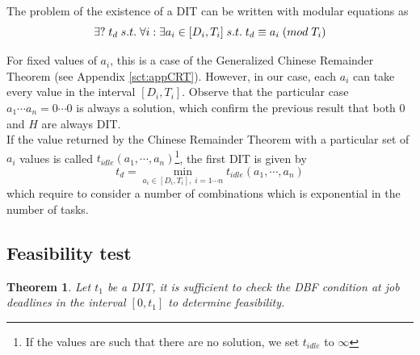 \documentclass[a4paper,10pt]{article}
\newtheorem{theorem}{Theorem}
\begin{document}
The problem of the existence of a DIT can be written with modular equations as
$$
\exists ? \; t_d \; s.t. \; \forall i : \exists a_i \in [D_i, T_i] \; s.t. \; t_d \equiv a_i \; (mod \; T_i) \\
$$

For fixed values of $a_i$, this is a case of the Generalized Chinese Remainder Theorem (see Appendix \ref{sct:appCRT}). However, in our case, each $a_i$ can take every value in the interval $[D_i, T_i]$. Observe that the particular case $a_1 \cdots a_n = 0 \cdots 0$ is always a solution, which confirm the previous result that both 0 and $H$ are always DIT.\\

If the value returned by the Chinese Remainder Theorem with a particular set of $a_i$ values is called $t_{idle} (a_1, \cdots, a_n)$\footnote{If the values are such that there are no solution, we set $t_{idle}$ to $\infty$}, the first DIT is given by $$t_d = \operatorname*{min}_{a_i \in [D_i, T_i], \; i = 1 \cdots n} t_{idle} (a_1, \cdots, a_n)$$ which require to consider a number of combinations which is exponential in the number of tasks.

\subsection{Feasibility test}
\label{sct:ditsynchfeastest}

\begin{theorem}
 Let $t_1$ be a DIT, it is sufficient to check the DBF condition at job deadlines in the interval $[0, t_1]$ to determine feasibility.
\end{theorem}
\end{document}
